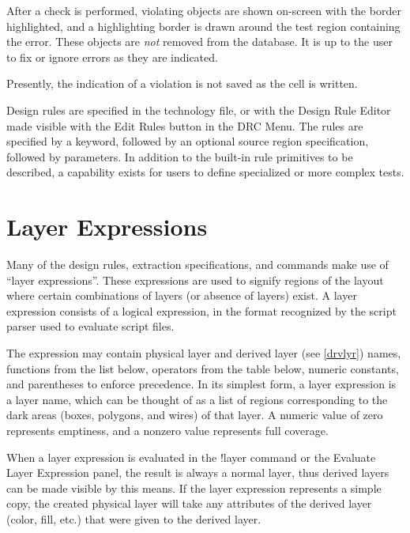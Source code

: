 After a check is performed, violating objects are shown on-screen with
the border highlighted, and a highlighting border is drawn around the
test region containing the error.  These objects are {\it not} removed
from the database.  It is up to the user to fix or ignore errors as
they are indicated.

Presently, the indication of a violation is not saved as the cell is
written.

Design rules are specified in the technology file, or with the {\cb
Design Rule Editor} made visible with the {\cb Edit Rules} button in
the {\cb DRC Menu}.  The rules are specified by a keyword, followed by
an optional source region specification, followed by parameters.  In
addition to the built-in rule primitives to be described, a capability
exists for users to define specialized or more complex tests.


\section{Layer Expressions}
\label{layerexp}
Many of the design rules, extraction specifications, and commands make
use of ``layer expressions''.  These expressions are used to signify
regions of the layout where certain combinations of layers (or absence
of layers) exist.  A layer expression consists of a logical
expression, in the format recognized by the script parser used to
evaluate script files.

The expression may contain physical layer and derived layer (see
\ref{drvlyr}) names, functions from the list below, operators from the
table below, numeric constants, and parentheses to enforce precedence. 
In its simplest form, a layer expression is a layer name, which can be
thought of as a list of regions corresponding to the dark areas
(boxes, polygons, and wires) of that layer.  A numeric value of zero
represents emptiness, and a nonzero value represents full coverage.

When a layer expression is evaluated in the {\cb !layer} command or
the {\cb Evaluate Layer Expression} panel, the result is always a
normal layer, thus derived layers can be made visible by this means. 
If the layer expression represents a simple copy, the created physical
layer will take any attributes of the derived layer (color, fill,
etc.) that were given to the derived layer. 


